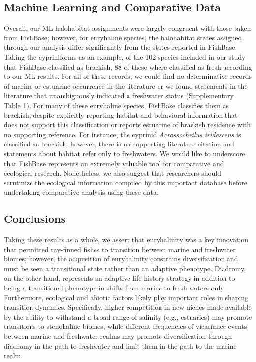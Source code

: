 \documentclass[11pt]{article}
\begin{document}
\subsection*{Machine Learning and Comparative Data}

Overall, our ML halohabitat assignments were largely congruent with those taken from FishBase; however, for euryhaline species, the halohabitat states assigned through our analysis differ significantly from the states reported in FishBase.  Taking the cypriniforms as an example, of the 102 species included in our study that FishBase classified as brackish, 88 of these where classified as fresh according to our ML results. For all of these records, we could find no determinative records of marine or estuarine occurrence in the literature or we found statements in the literature that unambiguously indicated a freshwater status (Supplementary Table 1). For many of these euryhaline species, FishBase classifies them as brackish, despite explicitly reporting habitat and behavioral information that does not support this classification or reports estuarine of brackish residence with no supporting reference. For instance, the cyprinid \textit{Acrossocheilus iridescens} is classified as brackish, however, there is no supporting literature citation and statements about habitat refer only to freshwaters. We would like to underscore that FishBase represents an extremely valuable tool for comparative and ecological research. Nonetheless, we also suggest that researchers should scrutinize the ecological information compiled by this important database before undertaking comparative analysis using these data.

\subsection*{Conclusions}

Taking these results as a whole, we assert that euryhalinity was a key innovation that permitted ray-finned fishes to transition between marine and freshwater biomes; however, the acquisition of euryhalinity constrains diversification and must be seen a transitional state rather than an adaptive phenotype.  Diadromy, on the other hand, represents an adaptive life history strategy in addition to being a transitional phenotype in shifts from marine to fresh waters only. Furthermore, ecological and abiotic factors likely play important roles in shaping transition dynamics. Specifically, higher competition in new niches made available by the ability to withstand a broad range of salinity (e.g., estuaries) may promote transitions to stenohaline biomes, while different frequencies of vicariance events between marine and freshwater realms may promote diversification through diadromy in the path to freshwater and limit them in the path to the marine realm.
\end{document}
